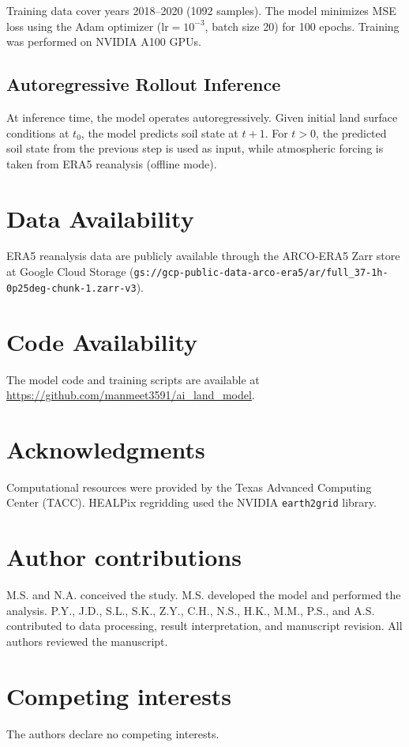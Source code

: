 \documentclass[11pt]{article}
\begin{document}
Training data cover years 2018--2020 (1092 samples). The model minimizes MSE loss using the Adam optimizer (lr$=10^{-3}$, batch size 20) for 100 epochs. Training was performed on NVIDIA A100 GPUs.

\subsection{Autoregressive Rollout Inference}

At inference time, the model operates autoregressively. Given initial land surface conditions at $t_0$, the model predicts soil state at $t+1$. For $t>0$, the predicted soil state from the previous step is used as input, while atmospheric forcing is taken from ERA5 reanalysis (offline mode).

\section{Data Availability}

ERA5 reanalysis data are publicly available through the ARCO-ERA5 Zarr store at Google Cloud Storage (\texttt{gs://gcp-public-data-arco-era5/ar/full\_37-1h-0p25deg-chunk-1.zarr-v3}).

\section{Code Availability}

The model code and training scripts are available at \url{https://github.com/manmeet3591/ai_land_model}.

\section{Acknowledgments}

Computational resources were provided by the Texas Advanced Computing Center (TACC). HEALPix regridding used the NVIDIA \texttt{earth2grid} library.

\section*{Author contributions}
M.S. and N.A. conceived the study. M.S. developed the model and performed the analysis. P.Y., J.D., S.L., S.K., Z.Y., C.H., N.S., H.K., M.M., P.S., and A.S. contributed to data processing, result interpretation, and manuscript revision. All authors reviewed the manuscript.

\section*{Competing interests}
The authors declare no competing interests.


\end{document}

